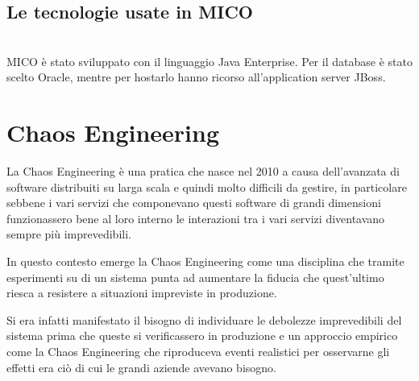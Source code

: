 \subsection{Le tecnologie usate in MICO}\mbox{}\\
MICO è stato sviluppato con il linguaggio Java Enterprise. Per il database è stato scelto Oracle, mentre per hostarlo hanno ricorso all'application server JBoss.

\section{Chaos Engineering}
La Chaos Engineering è una pratica che nasce nel 2010 a causa dell'avanzata di software distribuiti su larga scala e quindi molto difficili da gestire, in particolare sebbene i vari servizi che componevano questi software di grandi dimensioni funzionassero bene al loro interno le interazioni tra i vari servizi diventavano sempre più imprevedibili.

In questo contesto emerge la Chaos Engineering come una disciplina che tramite esperimenti su di un sistema punta ad aumentare la fiducia che quest'ultimo riesca a resistere a situazioni impreviste in produzione.

Si era infatti manifestato il bisogno di individuare le debolezze imprevedibili del sistema prima che queste si verificassero in produzione e un approccio empirico come la Chaos Engineering che riproduceva eventi realistici per osservarne gli effetti era ciò di cui le grandi aziende avevano bisogno.

